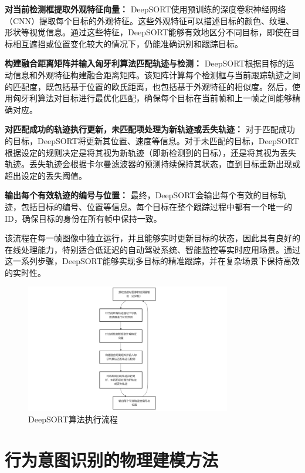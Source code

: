 \textbf{对当前检测框提取外观特征向量： }DeepSORT使用预训练的深度卷积神经网络（CNN）提取每个目标的外观特征。这些外观特征可以描述目标的颜色、纹理、形状等视觉信息。通过这些特征，DeepSORT能够有效地区分不同目标，即使在目标相互遮挡或位置变化较大的情况下，仍能准确识别和跟踪目标。

\textbf{构建融合距离矩阵并输入匈牙利算法匹配轨迹与检测： }DeepSORT根据目标的运动信息和外观特征构建融合距离矩阵。该矩阵计算每个检测框与当前跟踪轨迹之间的匹配度，既包括基于位置的欧氏距离，也包括基于外观特征的相似度。然后，使用匈牙利算法对目标进行最优化匹配，确保每个目标在当前帧和上一帧之间能够精确对应。

\textbf{对匹配成功的轨迹执行更新，未匹配项处理为新轨迹或丢失轨迹： }对于匹配成功的目标，DeepSORT将更新其位置、速度等信息。对于未匹配的目标，DeepSORT根据设定的规则决定是将其视为新轨迹（即新检测到的目标），还是将其视为丢失轨迹。丢失轨迹会根据卡尔曼滤波器的预测持续保持其状态，直到目标重新出现或超出设定的丢失阈值。

\textbf{输出每个有效轨迹的编号与位置： }最终，DeepSORT会输出每个有效的目标轨迹，包括目标的编号、位置等信息。每个目标在整个跟踪过程中都有一个唯一的ID，确保目标的身份在所有帧中保持一致。

该流程在每一帧图像中独立运行，并且能够实时更新目标的状态，因此具有良好的在线处理能力，特别适合低延迟的自动驾驶系统、智能监控等实时应用场景。通过这一系列步骤，DeepSORT能够实现多目标的精准跟踪，并在复杂场景下保持高效的实时性。
\begin{figure}[H]
    \centering
    \includegraphics[width=0.8\textwidth]{images/图2 DeepSORT算法执行流程.pdf}  %
    \caption{DeepSORT算法执行流程}
    \label{fig:example_image}  %
\end{figure}

\section{行为意图识别的物理建模方法}

